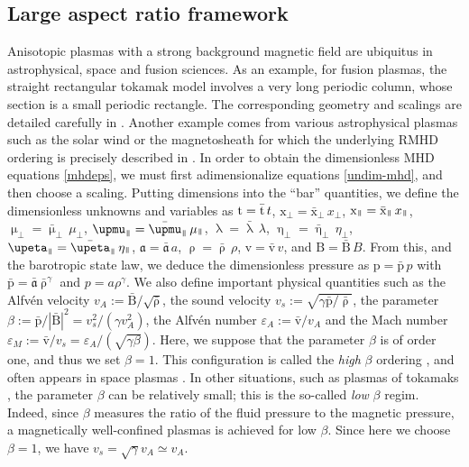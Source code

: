 \documentclass[11pt,reqno]{amsart}
\newcommand{\myparallel}{{\mkern3mu\vphantom{\perp}\vrule depth 0pt\mkern2mu\vrule depth 0pt\mkern3mu}}
\begin{document}
\subsection{Large aspect ratio framework}
\label{ss:LAR}
Anisotopic plasmas with a strong background magnetic field are ubiquitus in astrophysical, space and fusion sciences. As an example, for fusion plasmas, the straight rectangular tokamak model involves a very long periodic column, whose section is a small periodic rectangle. The corresponding geometry and scalings are detailed carefully in \cite{Str76}. Another example comes from various astrophysical plasmas such as the solar wind or the magnetosheath for which the underlying RMHD ordering is precisely described in \cite{SCD09}. In order to obtain the dimensionless MHD equations \eqref{mhdeps}, we must first  adimensionalize equations \eqref{undim-mhd}, and then choose a scaling. Putting dimensions into the ``bar'' quantities, we define the  dimensionless unknowns and variables as $\text{t}=\bar{\text t}\, t$, $\text{x}_\perp=\bar{\text{x}}_\perp\,x_\perp$,  $\text{x}_\myparallel=\bar{\text{x}}_\myparallel\,x_\myparallel$, $\upmu_\perp=\bar{\upmu}_\perp\, \mu_\perp$,  $\upmu_\myparallel=\bar{\upmu}_\myparallel\, \mu_\myparallel$, $\uplambda=\bar{\uplambda}\, \lambda$, $\upeta_\perp=\bar{\upeta}_\perp\, \eta_\perp$,  $\upeta_\myparallel=\bar{\upeta}_\myparallel\, \eta_\myparallel$, $\mathfrak a=\bar{\mathfrak a}\, a$, $\uprho = \bar{\uprho}\, \rho$, $\text{v}=\bar{\text{v}}\, v$, and  $\text{B}=\bar{\text{B}}\, B$.  From this, and the barotropic state law, we deduce the dimensionless pressure as $\text{p}=\bar{\text{p}}\, p$ with $\bar{\text{p}}=\bar{\mathfrak a} \bar{\uprho}^\gamma$ and $p=a\rho^\gamma$. We also define important physical quantities such as the Alfv\'en velocity $v_A:=\bar{\text{B}}/\sqrt{\bar{\uprho}}$, the sound velocity $v_s:=\sqrt{\gamma\bar{\text{p}}/ \bar{\uprho}}$, the parameter $\beta:=\bar{\text{p}}/|\bar{\text{B}}|^2=v_s^2/(\gamma v_A^2)$, the Alfv\'en number $\varepsilon_A:=\bar{\text{v}}/v_A$ and  the Mach number $\varepsilon_M:=\bar{\text{v}}/v_s=\varepsilon_A/(\sqrt{\gamma \beta})$. Here, we suppose that the parameter $\beta$ is of order one, and thus we set $\beta=1$. This configuration is called the \textit{high} $\beta$ ordering \cite{Str77}, and often appears in space plasmas \cite{BNS98, KW97, OMD17}. In other situations, such as plasmas of tokamaks \cite{DA83, IMS83, KP74}, the parameter  $\beta$ can be relatively small; this is the so-called \textit{low} $\beta$ regim. Indeed, since $\beta$ measures the ratio of the fluid pressure to the magnetic pressure, a magnetically well-confined plasmas is achieved for low $\beta$. Since here we choose $\beta=1$, we have $v_s=\sqrt{\gamma} v_A \simeq v_A$.
\end{document}
